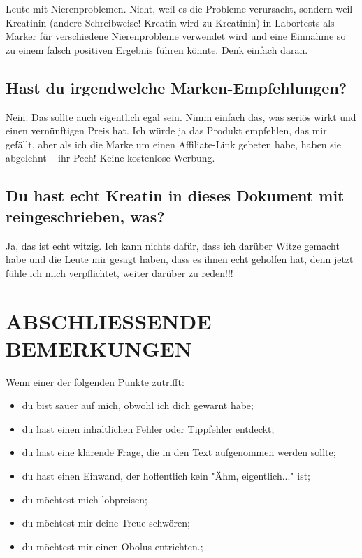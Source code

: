 \documentclass{article}
\begin{document}
Leute mit Nierenproblemen. Nicht, weil es die Probleme verursacht, sondern weil Kreatinin (andere Schreibweise! Kreatin wird zu Kreatinin) in Labortests als Marker für verschiedene Nierenprobleme verwendet wird und eine Einnahme so zu einem falsch positiven Ergebnis führen könnte. Denk einfach daran.

\subsection{Hast du irgendwelche Marken-Empfehlungen?}

Nein. Das sollte auch eigentlich egal sein. Nimm einfach das, was seriös wirkt und einen vernünftigen Preis hat. Ich würde ja das Produkt empfehlen, das mir gefällt, aber als ich die Marke um einen Affiliate-Link gebeten habe, haben sie abgelehnt – ihr Pech! Keine kostenlose Werbung.

\subsection{Du hast echt Kreatin in dieses Dokument mit reingeschrieben, was?}

Ja, das ist echt witzig. Ich kann nichts dafür, dass ich darüber Witze gemacht habe und die Leute mir gesagt haben, dass es ihnen echt geholfen hat, denn jetzt fühle ich mich verpflichtet, weiter darüber zu reden!!!

\section{ABSCHLIESSENDE BEMERKUNGEN}

Wenn einer der folgenden Punkte zutrifft:

\begin{itemize}
\item du bist sauer auf mich, obwohl ich dich gewarnt habe;

\item du hast einen inhaltlichen Fehler oder Tippfehler entdeckt;

\item du hast eine klärende Frage, die in den Text aufgenommen werden sollte;

\item du hast einen Einwand, der hoffentlich kein "Ähm, eigentlich..." ist;

\item du möchtest mich lobpreisen;

\item du möchtest mir deine Treue schwören;

\item du möchtest mir einen Obolus entrichten.;
\end{itemize}
\end{document}
